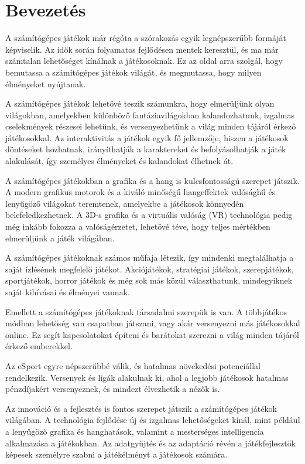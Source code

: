 \chapter{Bevezetés}

A számítógépes játékok már régóta a szórakozás egyik legnépszerűbb formáját képviselik. Az idők során folyamatos fejlődésen mentek keresztül, és ma már számtalan lehetőséget kínálnak a játékosoknak. Ez az oldal arra szolgál, hogy bemutassa a számítógépes játékok világát, és megmutassa, hogy milyen élményeket nyújtanak.

A számítógépes játékok lehetővé teszik számunkra, hogy elmerüljünk olyan világokban, amelyekben különböző fantáziavilágokban kalandozhatunk, izgalmas cselekmények részesei lehetünk, és versenyezhetünk a világ minden tájáról érkező játékosokkal. Az interaktivitás a játékok egyik fő jellemzője, hiszen a játékosok döntéseket hozhatnak, irányíthatják a karaktereket és befolyásolhatják a játék alakulását, így személyes élményeket és kalandokat élhetnek át.

A számítógépes játékokban a grafika és a hang is kulcsfontosságú szerepet játszik. A modern grafikus motorok és a kiváló minőségű hangeffektek valósághű és lenyűgöző világokat teremtenek, amelyekbe a játékosok könnyedén belefeledkezhetnek. A 3D-s grafika és a virtuális valóság (VR) technológia pedig még inkább fokozza a valóságérzetet, lehetővé téve, hogy teljes mértékben elmerüljünk a játék világában.

A számítógépes játékoknak számos műfaja létezik, így mindenki megtalálhatja a saját ízlésének megfelelő játékot. Akciójátékok, stratégiai játékok, szerepjátékok, sportjátékok, horror játékok és még sok más közül választhatunk, mindegyiknek saját kihívásai és élményei vannak.

Emellett a számítógépes játékoknak társadalmi szerepük is van. A többjátékos módban lehetőség van csapatban játszani, vagy akár versenyezni más játékosokkal online. Ez segít kapcsolatokat építeni és barátokat szerezni a világ minden tájáról érkező emberekkel.

Az eSport egyre népszerűbbé válik, és hatalmas növekedési potenciállal rendelkezik. Versenyek és ligák alakulnak ki, ahol a legjobb játékosok hatalmas pénzdíjakért versenyeznek, és mindezt élvezhetik a nézők is.

Az innováció és a fejlesztés is fontos szerepet játszik a számítógépes játékok világában. A technológia fejlődése új és izgalmas lehetőségeket kínál, mint például a lenyűgöző grafika és hanghatások, valamint a mesterséges intelligencia alkalmazása a játékokban. Az adatgyűjtés és az adaptáció révén a játékfejlesztők képesek személyre szabni a játékélményt a játékosok számára.

